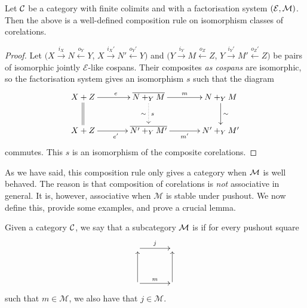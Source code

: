 \begin{proposition} \label{prop.corelcomp}
  Let $\mathcal C$ be a category with finite colimits and with a factorisation system
  $(\mathcal E,\mathcal M)$. Then the above is a well-defined composition rule on
  isomorphism classes of corelations.
\end{proposition}
\begin{proof}
  Let
  $(X \stackrel{i_X}{\longrightarrow} N \stackrel{o_Y}{\longleftarrow} Y$,
  $X \stackrel{i_X'}{\longrightarrow} N' \stackrel{o_Y'}{\longleftarrow} Y)$
  and
  $(Y \stackrel{i_Y}{\longrightarrow} M \stackrel{o_Z}{\longleftarrow} Z$, $Y
  \stackrel{i_Y'}{\longrightarrow} M' \stackrel{o_Z'}{\longleftarrow} Z)$
  be pairs of isomorphic jointly $\mathcal E$-like cospans. Their composites
  \emph{as cospans} 
  are isomorphic, so the factorisation system gives an isomorphism $s$ such that
  the diagram
  \[
    \xymatrixcolsep{3pc}
    \xymatrixrowsep{2pc}
    \xymatrix{
      X+Z \ar[r]^e \ar@{=}[d] & \overline{N+_YM} \ar[r]^m \ar@{.>}[d]^{s}_\sim & N+_YM
      \ar[d]^\sim \\
      X+Z \ar[r]_{e'}&\overline{N'+_YM'} \ar[r]_{m'} & N'+_YM'
    }
  \]
  commutes. This $s$ is an isomorphism of the composite corelations.
\end{proof}

As we have said, this composition rule only gives a category when $\mathcal M$ is
well behaved. The reason is that composition of corelations is \emph{not}
associative in general. It is, however, associative when $\mathcal M$ is stable
under pushout. We now define this, provide some examples, and prove a crucial
lemma.

\begin{definition}
  Given a category $\mathcal C$, we say that a subcategory $\mathcal M$ is  if for every pushout square
  \[
    \xymatrixcolsep{3pc}
    \xymatrixrowsep{3pc}
    \xymatrix{
      \ar[r]^j & \\
      \ar[u] \ar[r]^m &  \ar[u]
    }
  \]
  such that $m \in \mathcal M$, we also have that $j \in \mathcal M$. 
\end{definition}

